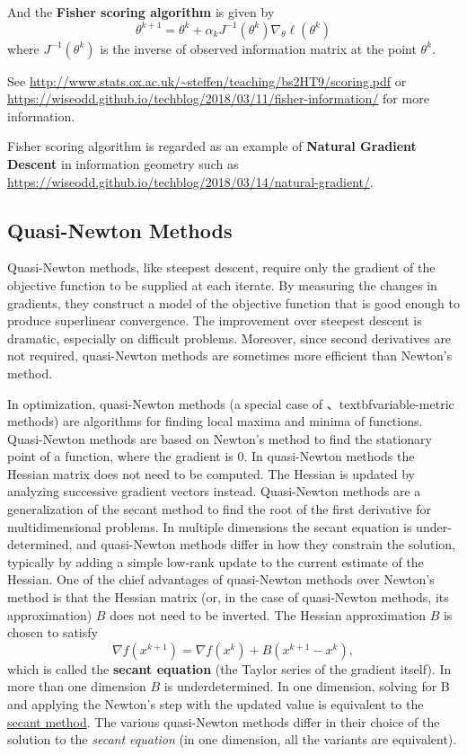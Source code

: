 \documentclass[titlestyle=hang,11pt]{elegantbook}
\begin{document}
And the \textbf{Fisher scoring algorithm} is given by
$$\theta^{k+1}=\theta^{k}+\alpha_{k}J^{-1}(\theta^{k})\nabla_{\theta} \ell(\theta^{k})$$
where $J^{-1}(\theta^{k})$ is the inverse of observed information matrix at the point $\theta^{k}$.

See \url{http://www.stats.ox.ac.uk/~steffen/teaching/bs2HT9/scoring.pdf} or \url{https://wiseodd.github.io/techblog/2018/03/11/fisher-information/} for more information.

Fisher scoring algorithm is regarded  as an example of \textbf{Natural Gradient Descent} in
information geometry  such as \url{https://wiseodd.github.io/techblog/2018/03/14/natural-gradient/}.

\subsection{Quasi-Newton Methods}

Quasi-Newton methods, like steepest descent, require only the gradient of the objective
function to be supplied at each iterate.
By measuring the changes in gradients, they construct a model of the objective function
that is good enough to produce superlinear convergence.
The improvement over steepest descent is dramatic, especially on difficult
problems. Moreover, since second derivatives are not required, quasi-Newton methods are
sometimes more efficient than Newton's method.

In optimization, quasi-Newton methods (a special case of 、textbf{variable-metric methods}) are algorithms for finding local maxima and minima of functions. 
Quasi-Newton methods are based on Newton's method to find the stationary point of a function, where the gradient is $0$.
In quasi-Newton methods the Hessian matrix does not need to be computed. The Hessian is updated by analyzing successive gradient vectors instead. Quasi-Newton methods are a generalization of the secant method to find the root of the first derivative for multidimensional problems. In multiple dimensions the secant equation is under-determined, and quasi-Newton methods differ in how they constrain the solution, typically by adding a simple low-rank update to the current estimate of the Hessian.
One of the chief advantages of quasi-Newton methods over Newton's method is that the Hessian matrix (or, in the case of quasi-Newton methods, its approximation) $B$ does not need to be inverted. The Hessian approximation $B$ is chosen to satisfy
$$ \nabla f(x^{k+1})=\nabla f(x^{k})+B(x^{k+1}-x^{k}), $$
which is called the \textbf{secant equation} (the Taylor series of the gradient itself).
In more than one dimension $B$ is underdetermined. In one dimension, solving for B and applying the Newton's step with the updated value is equivalent to the \href{https://www.wikiwand.com/en/Secant_method}{secant method}.
The various quasi-Newton methods differ in their choice of the solution to the \emph{secant equation} (in one dimension, all the variants are equivalent).
\end{document}
